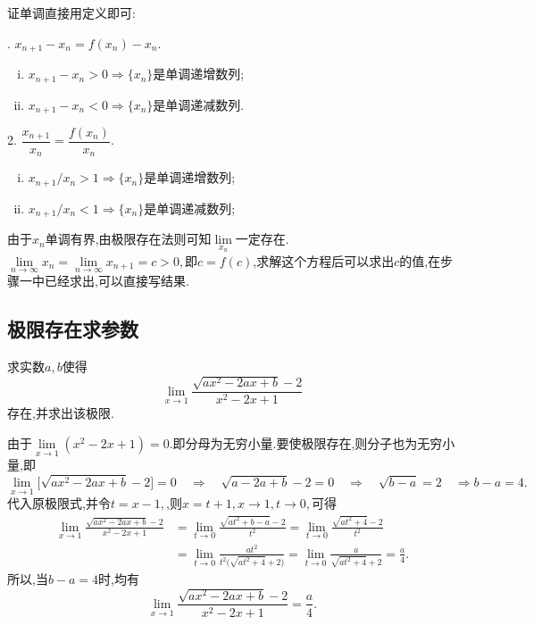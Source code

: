 \noindent {}

证单调直接用定义即可:\sj
\begin{multicols}{2}
	.$\,\,x_{n+1}-x_n=f(x_n)-x_n$.
	\begin{enumerate}[(i)]
		\item $x_{n+1}-x_n>0\Rightarrow\{x_n\}$是单调递增数列;
		\item $x_{n+1}-x_n<0\Rightarrow\{x_n\}$是单调递减数列.
	\end{enumerate}
	2.$\,\,\dfrac{x_{n+1}}{x_n}=\dfrac{f(x_n)}{x_n}$.
	\begin{enumerate}[(i)]
		\item $x_{n+1}/x_n>1\Rightarrow \{x_n\}$是单调递增数列;
		\item $x_{n+1}/x_n<1\Rightarrow \{x_n\}$是单调递减数列;
	\end{enumerate}
\end{multicols}
\sj
\warn
[
\kg 在有变号的数列中第二种方法不适用.
]
\jg

\noindent {}

由于$x_n$单调有界,由极限存在法则可知$\lim\limits_{x_n}$一定存在.$\lim\limits_{n \to \infty}x_n=\lim\limits_{n \to \infty}x_{n+1}=c>0,$即$c=f(c)$,求解这个方程后可以求出$c$的值,在步骤一中已经求出,可以直接写结果.
\warn
[
\kg $\lim\limits_{n \to \infty}x_n=\lim\limits_{n \to \infty}x_{n+1}=c$成立的前提条件是数列${x_n}$单调有界(或$\{x_n\}$收敛).
]

\subsection{极限存在求参数}
\texample[极限存在求参数]\sj

\examples 求实数$a,b$使得
\[
\lim\limits_{x \to 1}\frac{\sqrt{ax^2-2ax+b}-2}{x^2-2x+1}
\]
存在,并求出该极限.

\solve 由于$\lim\limits_{x \to 1}(x^2-2x+1)=0$.即分母为无穷小量.要使极限存在,则分子也为无穷小量,即
\[
\lim\limits_{x \to 1}\big[\sqrt{ax^2-2ax+b}-2\big]=0 \quad \Rightarrow \quad \sqrt{a-2a+b}-2=0 \quad \Rightarrow \quad \sqrt{b-a}=2 \quad \Rightarrow b-a=4.
\]
代入原极限式,并令$t=x-1,$,则$x=t+1,x\to1,t \to 0,$可得
\[
\begin{split}
	\lim\limits_{x \to 1}\frac{\sqrt{ax^2-2ax+b}-2}{x^2-2x+1}&=\lim\limits_{t \to 0}\frac{\sqrt{at^2+b-a}-2}{t^2}=\lim\limits_{t \to 0}\frac{\sqrt{at^2+4}-2}{t^2}\\
	&=\lim\limits_{t \to 0}\frac{at^2}{t^2\big(\sqrt{at^2+4}+2\big)}=\lim\limits_{t \to 0}\frac{a}{\sqrt{at^2+4}+2}=\frac{a}{4}.
\end{split}
\]
所以,当$b-a=4$时,均有
\[
\lim\limits_{x \to 1}\frac{\sqrt{ax^2-2ax+b}-2}{x^2-2x+1}=\frac a4.
\]

